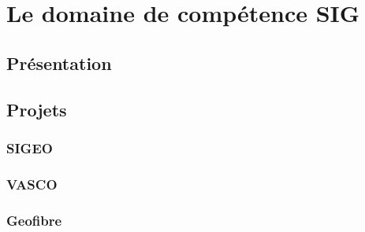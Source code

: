 \chapter{Le domaine de compétence SIG}
\section{Présentation}
\section{Projets}
\subsection{SIGEO}
\subsection{VASCO}
\subsection{Geofibre}
